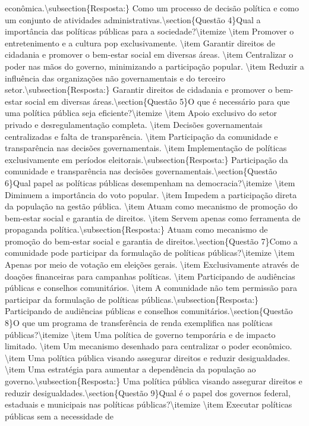 \documentclass[
   article,       
   12pt,          
   oneside,       
   a4paper,       
   english,       
   brazil,        
   sumario=tradicional
   ]{abntex2}
\begin{document}
econômica.\textbackslash{}subsection\{Resposta:\} Como um processo de decisão política e como um conjunto de atividades administrativas.\textbackslash{}section\{Questão 4\}Qual a importância das políticas públicas para a sociedade?\textbackslash{}itemize    \textbackslash{}item Promover o entretenimento e a cultura pop exclusivamente.    \textbackslash{}item Garantir direitos de cidadania e promover o bem-estar social em diversas áreas.    \textbackslash{}item Centralizar o poder nas mãos do governo, minimizando a participação popular.    \textbackslash{}item Reduzir a influência das organizações não governamentais e do terceiro setor.\textbackslash{}subsection\{Resposta:\} Garantir direitos de cidadania e promover o bem-estar social em diversas áreas.\textbackslash{}section\{Questão 5\}O que é necessário para que uma política pública seja eficiente?\textbackslash{}itemize    \textbackslash{}item Apoio exclusivo do setor privado e desregulamentação completa.    \textbackslash{}item Decisões governamentais centralizadas e falta de transparência.    \textbackslash{}item Participação da comunidade e transparência nas decisões governamentais.    \textbackslash{}item Implementação de políticas exclusivamente em períodos eleitorais.\textbackslash{}subsection\{Resposta:\} Participação da comunidade e transparência nas decisões governamentais.\textbackslash{}section\{Questão 6\}Qual papel as políticas públicas desempenham na democracia?\textbackslash{}itemize    \textbackslash{}item Diminuem a importância do voto popular.    \textbackslash{}item Impedem a participação direta da população na gestão pública.    \textbackslash{}item Atuam como mecanismo de promoção do bem-estar social e garantia de direitos.    \textbackslash{}item Servem apenas como ferramenta de propaganda política.\textbackslash{}subsection\{Resposta:\} Atuam como mecanismo de promoção do bem-estar social e garantia de direitos.\textbackslash{}section\{Questão 7\}Como a comunidade pode participar da formulação de políticas públicas?\textbackslash{}itemize    \textbackslash{}item Apenas por meio de votação em eleições gerais.    \textbackslash{}item Exclusivamente através de doações financeiras para campanhas políticas.    \textbackslash{}item Participando de audiências públicas e conselhos comunitários.    \textbackslash{}item A comunidade não tem permissão para participar da formulação de políticas públicas.\textbackslash{}subsection\{Resposta:\} Participando de audiências públicas e conselhos comunitários.\textbackslash{}section\{Questão 8\}O que um programa de transferência de renda exemplifica nas políticas públicas?\textbackslash{}itemize    \textbackslash{}item Uma política de governo temporária e de impacto limitado.    \textbackslash{}item Um mecanismo desenhado para centralizar o poder econômico.    \textbackslash{}item Uma política pública visando assegurar direitos e reduzir desigualdades.    \textbackslash{}item Uma estratégia para aumentar a dependência da população ao governo.\textbackslash{}subsection\{Resposta:\} Uma política pública visando assegurar direitos e reduzir desigualdades.\textbackslash{}section\{Questão 9\}Qual é o papel dos governos federal, estaduais e municipais nas políticas públicas?\textbackslash{}itemize    \textbackslash{}item Executar políticas públicas sem a necessidade de 
\end{document}
